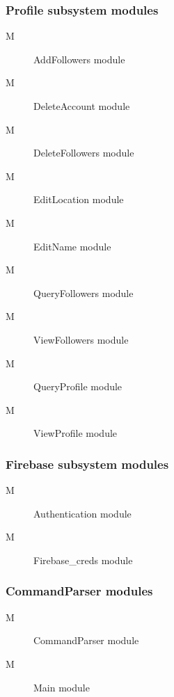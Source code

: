 \documentclass[12pt, titlepage]{article}
\newcounter{mnum}
\newcommand{\mthemnum}{M\themnum}
\begin{document}
\subsubsection{Profile subsystem modules}
\begin{description}
\item[ \mthemnum \label{M6}] AddFollowers module
\item[ \mthemnum \label{M7}] DeleteAccount module
\item[ \mthemnum \label{M8}] DeleteFollowers module
\item[ \mthemnum \label{M9}] EditLocation module
\item[ \mthemnum \label{M10}] EditName module
\item[ \mthemnum \label{M11}] QueryFollowers module
\item[ \mthemnum \label{M12}] ViewFollowers module
\item[ \mthemnum \label{M13}] QueryProfile module
\item[ \mthemnum \label{M14}] ViewProfile module
\end{description}

\subsubsection{Firebase subsystem modules}
\begin{description}
\item[ \mthemnum \label{M15}] Authentication module
\item[ \mthemnum \label{M16}] Firebase\_creds module
\end{description}

\subsubsection{CommandParser modules}
\begin{description}
\item[ \mthemnum \label{M17}] CommandParser module
\item[ \mthemnum \label{M18}] Main module
\end{description}
\end{document}
